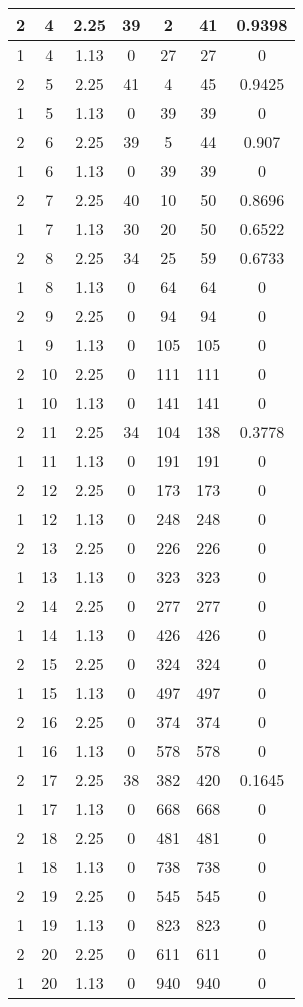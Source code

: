 \documentclass[letterpaper, 12pt]{article}
\begin{document}
\begin{longtable}{|c|c|c|c|c|c|c|}
\hline
2 & 4 & 2.25 & 39 & 2 & 41 & 0.9398 \\
\hline
1 & 4 & 1.13 & 0 & 27 & 27 & 0 \\
\hline
2 & 5 & 2.25 & 41 & 4 & 45 & 0.9425 \\
\hline
1 & 5 & 1.13 & 0 & 39 & 39 & 0 \\
\hline
2 & 6 & 2.25 & 39 & 5 & 44 & 0.907 \\
\hline
1 & 6 & 1.13 & 0 & 39 & 39 & 0 \\
\hline
2 & 7 & 2.25 & 40 & 10 & 50 & 0.8696 \\
\hline
1 & 7 & 1.13 & 30 & 20 & 50 & 0.6522 \\
\hline
2 & 8 & 2.25 & 34 & 25 & 59 & 0.6733 \\
\hline
1 & 8 & 1.13 & 0 & 64 & 64 & 0 \\
\hline
2 & 9 & 2.25 & 0 & 94 & 94 & 0 \\
\hline
1 & 9 & 1.13 & 0 & 105 & 105 & 0 \\
\hline
2 & 10 & 2.25 & 0 & 111 & 111 & 0 \\
\hline
1 & 10 & 1.13 & 0 & 141 & 141 & 0 \\
\hline
2 & 11 & 2.25 & 34 & 104 & 138 & 0.3778 \\
\hline
1 & 11 & 1.13 & 0 & 191 & 191 & 0 \\
\hline
2 & 12 & 2.25 & 0 & 173 & 173 & 0 \\
\hline
1 & 12 & 1.13 & 0 & 248 & 248 & 0 \\
\hline
2 & 13 & 2.25 & 0 & 226 & 226 & 0 \\
\hline
1 & 13 & 1.13 & 0 & 323 & 323 & 0 \\
\hline
2 & 14 & 2.25 & 0 & 277 & 277 & 0 \\
\hline
1 & 14 & 1.13 & 0 & 426 & 426 & 0 \\
\hline
2 & 15 & 2.25 & 0 & 324 & 324 & 0 \\
\hline
1 & 15 & 1.13 & 0 & 497 & 497 & 0 \\
\hline
2 & 16 & 2.25 & 0 & 374 & 374 & 0 \\
\hline
1 & 16 & 1.13 & 0 & 578 & 578 & 0 \\
\hline
2 & 17 & 2.25 & 38 & 382 & 420 & 0.1645 \\
\hline
1 & 17 & 1.13 & 0 & 668 & 668 & 0 \\
\hline
2 & 18 & 2.25 & 0 & 481 & 481 & 0 \\
\hline
1 & 18 & 1.13 & 0 & 738 & 738 & 0 \\
\hline
2 & 19 & 2.25 & 0 & 545 & 545 & 0 \\
\hline
1 & 19 & 1.13 & 0 & 823 & 823 & 0 \\
\hline
2 & 20 & 2.25 & 0 & 611 & 611 & 0 \\
\hline
1 & 20 & 1.13 & 0 & 940 & 940 & 0 \\
\hline
\end{longtable}
\end{document}
